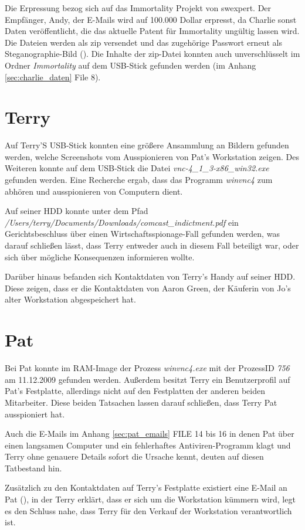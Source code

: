 Die Erpressung bezog sich auf das Immortality Projekt von swexpert. Der Empfänger, Andy, der E-Mails wird auf 100.000 Dollar erpresst, da Charlie sonst Daten veröffentlicht, die das aktuelle Patent für Immortality ungültig lassen wird. Die Dateien werden als zip versendet und das zugehörige Passwort erneut als Steganographie-Bild (). Die Inhalte der zip-Datei konnten auch unverschlüsselt im Ordner \textit{Immortality} auf dem USB-Stick gefunden werden (im Anhang \ref{sec:charlie_daten} File 8).

\section{Terry}
\label{sec:terry}
Auf Terry'S USB-Stick konnten eine größere Ansammlung an Bildern gefunden werden, welche Screenshots vom Ausspionieren von Pat's Workstation zeigen. Des Weiteren konnte auf dem USB-Stick die Datei \textit{vnc-4_1_3-x86_win32.exe} gefunden werden. Eine Recherche ergab, dass das Programm \textit{winvnc4} zum abhören und ausspionieren von Computern dient.

Auf seiner HDD konnte unter dem Pfad \textit{/Users/terry/Documents/Downloads/comcast_indictment.pdf} ein Gerichtsbeschluss über einen Wirtschaftsspionage-Fall gefunden werden, was darauf schließen lässt, dass Terry entweder auch in diesem Fall beteiligt war, oder sich über mögliche Konsequenzen informieren wollte.\newline

Darüber hinaus befanden sich Kontaktdaten von Terry's Handy auf seiner HDD. Diese zeigen, dass er die Kontaktdaten von Aaron Green, der Käuferin von Jo's alter Workstation abgespeichert hat.

\section{Pat}
\label{sec:pat}
Bei Pat konnte im RAM-Image der Prozess \textit{winvnc4.exe} mit der ProzessID \textit{756} am 11.12.2009 gefunden werden. Außerdem besitzt Terry ein Benutzerprofil auf Pat's Festplatte, allerdings nicht auf den Festplatten der anderen beiden Mitarbeiter. Diese beiden Tatsachen lassen darauf schließen, dass Terry Pat ausspioniert hat.

Auch die E-Mails im Anhang \ref{sec:pat_emails} FILE 14 bis 16 in denen Pat über einen langsamen Computer und ein fehlerhaftes Antiviren-Programm klagt und Terry ohne genauere Details sofort die Ursache kennt, deuten auf diesen Tatbestand hin.\newline

Zusätzlich zu den Kontaktdaten auf Terry's Festplatte existiert eine E-Mail an Pat (), in der Terry erklärt, dass er sich um die Workstation kümmern wird, legt es den Schluss nahe, dass Terry für den Verkauf der Workstation verantwortlich ist.

